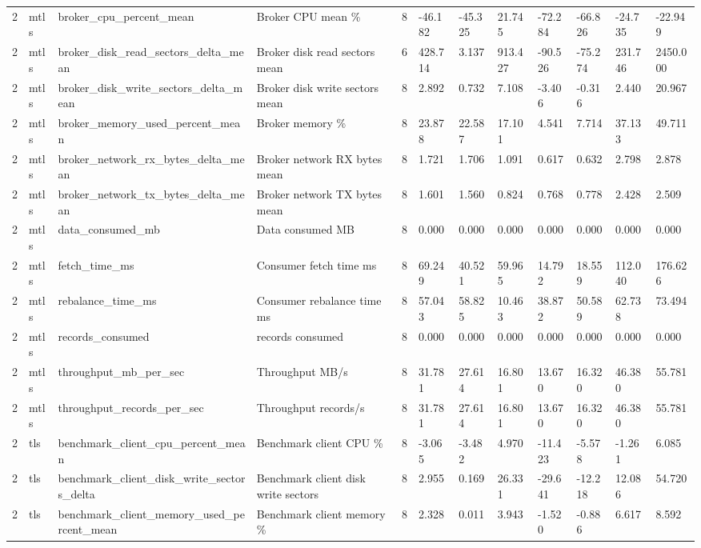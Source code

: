 \begin{longtable}{llllllllllll}
2 & mtls & broker\_cpu\_percent\_mean & Broker CPU mean \% & 8 & -46.182 & -45.325 & 21.745 & -72.284 & -66.826 & -24.735 & -22.949 \\
2 & mtls & broker\_disk\_read\_sectors\_delta\_mean & Broker disk read sectors mean & 6 & 428.714 & 3.137 & 913.427 & -90.526 & -75.274 & 231.746 & 2450.000 \\
2 & mtls & broker\_disk\_write\_sectors\_delta\_mean & Broker disk write sectors mean & 8 & 2.892 & 0.732 & 7.108 & -3.406 & -0.316 & 2.440 & 20.967 \\
2 & mtls & broker\_memory\_used\_percent\_mean & Broker memory \% & 8 & 23.878 & 22.587 & 17.101 & 4.541 & 7.714 & 37.133 & 49.711 \\
2 & mtls & broker\_network\_rx\_bytes\_delta\_mean & Broker network RX bytes mean & 8 & 1.721 & 1.706 & 1.091 & 0.617 & 0.632 & 2.798 & 2.878 \\
2 & mtls & broker\_network\_tx\_bytes\_delta\_mean & Broker network TX bytes mean & 8 & 1.601 & 1.560 & 0.824 & 0.768 & 0.778 & 2.428 & 2.509 \\
2 & mtls & data\_consumed\_mb & Data consumed MB & 8 & 0.000 & 0.000 & 0.000 & 0.000 & 0.000 & 0.000 & 0.000 \\
2 & mtls & fetch\_time\_ms & Consumer fetch time ms & 8 & 69.249 & 40.521 & 59.965 & 14.792 & 18.559 & 112.040 & 176.626 \\
2 & mtls & rebalance\_time\_ms & Consumer rebalance time ms & 8 & 57.043 & 58.825 & 10.463 & 38.872 & 50.589 & 62.738 & 73.494 \\
2 & mtls & records\_consumed & records consumed & 8 & 0.000 & 0.000 & 0.000 & 0.000 & 0.000 & 0.000 & 0.000 \\
2 & mtls & throughput\_mb\_per\_sec & Throughput MB/s & 8 & 31.781 & 27.614 & 16.801 & 13.670 & 16.320 & 46.380 & 55.781 \\
2 & mtls & throughput\_records\_per\_sec & Throughput records/s & 8 & 31.781 & 27.614 & 16.801 & 13.670 & 16.320 & 46.380 & 55.781 \\
2 & tls & benchmark\_client\_cpu\_percent\_mean & Benchmark client CPU \% & 8 & -3.065 & -3.482 & 4.970 & -11.423 & -5.578 & -1.261 & 6.085 \\
2 & tls & benchmark\_client\_disk\_write\_sectors\_delta & Benchmark client disk write sectors & 8 & 2.955 & 0.169 & 26.331 & -29.641 & -12.218 & 12.086 & 54.720 \\
2 & tls & benchmark\_client\_memory\_used\_percent\_mean & Benchmark client memory \% & 8 & 2.328 & 0.011 & 3.943 & -1.520 & -0.886 & 6.617 & 8.592 \\

\end{longtable}
